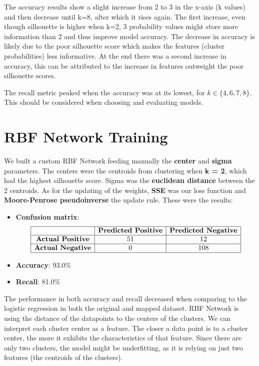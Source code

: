 \documentclass[a4paper,12pt]{article}
\begin{document}
The accuracy results show a slight increase from 2 to 3 in the x-axis (k values) and then decrease until k=8, after which it rises again. The first increase, even though silhouette is higher when k=2, 3 probability values might store more information than 2 and thus improve model accuracy. The decrease in accuracy is likely due to the poor silhouette score which makes the features (cluster probabilities) less informative. At the end there was a second increase in accuracy, this can be attributed to the increase in features outweight the poor silhouette scores.

The recall metric peaked when the accuracy was at its lowest, for \( k \in \{ 4, 6, 7, 8 \} \). This should be considered when choosing and evaluating models.



\section{RBF Network Training}
\label{sec:rbf-network}
We built a custom RBF Network feeding manually the \textbf{center} and \textbf{sigma} parameters. The centers were the centroids from clustering when \textbf{k = 2}, which had the highest silhouette score. Sigma was the \textbf{euclidean distance} between the 2 centroids. As for the updating of the weights, \textbf{SSE} was our loss function and \textbf{Moore-Penrose pseudoinverse} the update rule. These were the results:
\begin{itemize}
    \item \textbf{Confusion matrix}: 
    \[
    \begin{array}{|c|c|c|}
    \hline
    & \textbf{Predicted Positive} & \textbf{Predicted Negative} \\
    \hline
    \textbf{Actual Positive} & 51 & 12 \\
    \hline
    \textbf{Actual Negative} & 0 & 108 \\
    \hline
    \end{array}
    \]
    \item \textbf{Accuracy}: 93.0\%
    \item \textbf{Recall}: 81.0\%
\end{itemize}
The performance in both accuracy and recall decreased when comparing to the logistic regression in both the original and mapped dataset.  RBF Network is using the distance of the datapoints to the centers of the clusters. We can interpret each cluster center as a feature. The closer a data point is to a cluster center, the more it exhibits the characteristics of that feature. Since there are only two clusters, the model might be underfitting, as it is relying on just two features (the centroids of the clusters).
\end{document}
